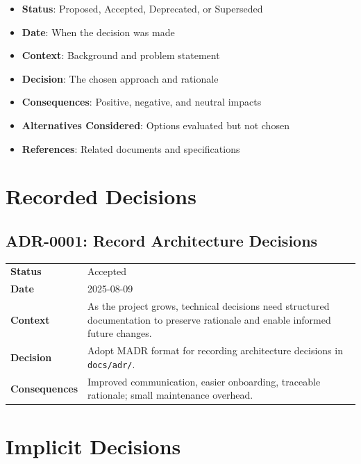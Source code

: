 \documentclass[a4paper,twoside]{sapthesis}
\begin{document}
\begin{itemize}
    \item \textbf{Status}: Proposed, Accepted, Deprecated, or Superseded
    \item \textbf{Date}: When the decision was made
    \item \textbf{Context}: Background and problem statement
    \item \textbf{Decision}: The chosen approach and rationale
    \item \textbf{Consequences}: Positive, negative, and neutral impacts
    \item \textbf{Alternatives Considered}: Options evaluated but not chosen
    \item \textbf{References}: Related documents and specifications
\end{itemize}

\section{Recorded Decisions}
\label{app:adr:decisions}

\subsection{ADR-0001: Record Architecture Decisions}

\begin{table}[ht]
\centering
\small
\begin{tabularx}{\textwidth}{lX}
    \hline
    \textbf{Status} & Accepted \\
    \textbf{Date} & 2025-08-09 \\
    \textbf{Context} & As the project grows, technical decisions need structured documentation to preserve rationale and enable informed future changes. \\
    \textbf{Decision} & Adopt MADR format for recording architecture decisions in \texttt{docs/adr/}. \\
    \textbf{Consequences} & Improved communication, easier onboarding, traceable rationale; small maintenance overhead. \\
    \hline
\end{tabularx}
\end{table}

\section{Implicit Decisions}
\label{app:adr:implicit}
\end{document}
